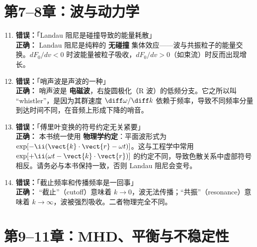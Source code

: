 \section{第7--8章：波与动力学}

\begin{warning}
\begin{enumerate}
\setcounter{enumi}{10}
\item \textbf{错误：}「Landau 阻尼是碰撞导致的能量耗散」\\
\textbf{正确：} Landau 阻尼是纯粹的 \textbf{无碰撞} 集体效应——波与共振粒子的能量交换。$dF_0/dv<0$ 时波能量被粒子吸收，$dF_0/dv>0$（如束流）时反而出现增长。

\item \textbf{错误：}「哨声波是声波的一种」\\
\textbf{正确：} 哨声波是 \textbf{电磁波}，右旋圆极化（R 波）的低频分支。它之所以叫 ``whistler''，是因为其群速度 $\diff\omega/\diff k$ 依赖于频率，导致不同频率分量到达时间不同，在音频上形成下降的哨音。

\item \textbf{错误：}「傅里叶变换的符号约定无关紧要」\\
\textbf{正确：} 本书统一使用 \textbf{物理学约定}：平面波形式为 $\exp[-\ii(\vect{k}\cdot\vect{r}-\omega t)]$。这与工程学中常用 $\exp[+\ii(\omega t - \vect{k}\cdot\vect{r})]$ 的约定不同，导致色散关系中虚部符号相反。请务必与本书保持一致，否则 Landau 阻尼会变号。

\item \textbf{错误：}「截止频率和传播频率是一回事」\\
\textbf{正确：} ``截止''（cutoff）意味着 $k\to 0$，波无法传播；``共振''（resonance）意味着 $k\to\infty$，波被强烈吸收。二者物理完全不同。
\end{enumerate}
\end{warning}


\section{第9--11章：MHD、平衡与不稳定性}

